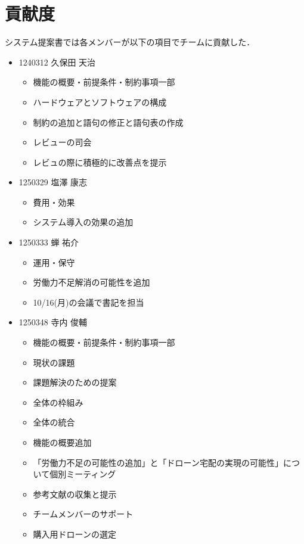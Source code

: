 \documentclass[a4paper, titlepage]{jsarticle}
\begin{document}
\section{貢献度}
システム提案書では各メンバーが以下の項目でチームに貢献した．
\begin{itemize}
  \item 1240312 久保田 天治
        \begin{itemize}
          \item 機能の概要・前提条件・制約事項一部
          \item ハードウェアとソフトウェアの構成
          \item 制約の追加と語句の修正と語句表の作成
          \item レビューの司会
          \item レビュの際に積極的に改善点を提示
        \end{itemize}
  \item 1250329 塩澤 康志
        \begin{itemize}
          \item 費用・効果
          \item システム導入の効果の追加
        \end{itemize}
  \item 1250333 蝉 祐介
        \begin{itemize}
          \item 運用・保守
          \item 労働力不足解消の可能性を追加
          \item 10/16(月)の会議で書記を担当
        \end{itemize}
  \item 1250348 寺内 俊輔
        \begin{itemize}
          \item 機能の概要・前提条件・制約事項一部
          \item 現状の課題
          \item 課題解決のための提案
          \item 全体の枠組み
          \item 全体の統合
          \item 機能の概要追加
          \item 「労働力不足の可能性の追加」と「ドローン宅配の実現の可能性」について個別ミーティング
          \item 参考文献の収集と提示
          \item チームメンバーのサポート
          \item 購入用ドローンの選定

\end{itemize}
\end{itemize}
\end{document}
